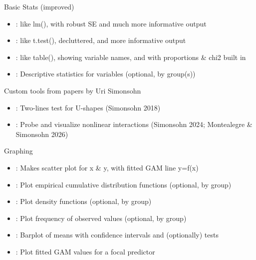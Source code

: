 \documentclass[a4paper]{book}
\begin{document}
%
\begin{Section}{Basic Stats (improved)}

\begin{itemize}

\item{} : like lm(), with robust SE and much more informative output
\item{} : like t.test(), decluttered, and more informative output 
\item{} : like table(), showing variable names, and with proportions \& chi2 built in
\item{} : Descriptive statistics for variables (optional, by group(s))

\end{itemize}

\end{Section}
%
\begin{Section}{Custom tools from papers by Uri Simonsohn}

\begin{itemize}

\item{} : Two-lines test for U-shapes (Simonsohn 2018)
\item{} : Probe and visualize nonlinear interactions (Simonsohn 2024; Montealegre \& Simonsohn 2026)

\end{itemize}

\end{Section}
%
\begin{Section}{Graphing}

\begin{itemize}

\item{} : Makes scatter plot for x \& y, with fitted GAM line y=f(x)
\item{} : Plot empirical cumulative distribution functions (optional, by group)
\item{} : Plot density functions (optional, by group)
\item{} : Plot frequency of observed values (optional, by group)
\item{} : Barplot of means with confidence intervals and (optionally) tests
\item{} : Plot fitted GAM values for a focal predictor

\end{itemize}

\end{Section}
\end{document}
